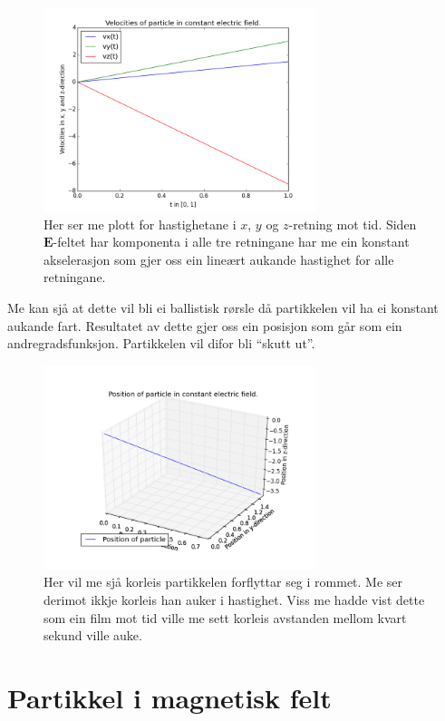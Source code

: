 \documentclass[11pt, a4paper]{article}
\begin{document}
  \begin{figure}[H]
    \centering
    \includegraphics[width=300px]{C2.png}
    \caption{Her ser me plott for hastighetane i $x$, $y$ og $z$-retning mot tid. Siden $\mathbf{E}$-feltet har komponenta i alle tre retningane har me ein konstant akselerasjon 
    som gjer oss ein lineært aukande hastighet for alle retningane.}
  \end{figure}
  Me kan sjå at dette vil bli ei ballistisk rørsle då partikkelen vil ha ei konstant aukande fart. Resultatet av dette gjer oss ein posisjon som går som ein andregradsfunksjon.
  Partikkelen vil difor bli ``skutt ut''.

  \begin{figure}[H]
    \centering
    \includegraphics[width=300px]{D.png}
    \caption{Her vil me sjå korleis partikkelen forflyttar seg i rommet. Me ser derimot ikkje korleis han auker i hastighet. Viss me hadde vist dette som ein film mot tid ville me 
    sett korleis avstanden mellom kvart sekund ville auke.}
  \end{figure}


\newpage
\section{Partikkel i magnetisk felt}
\end{document}
